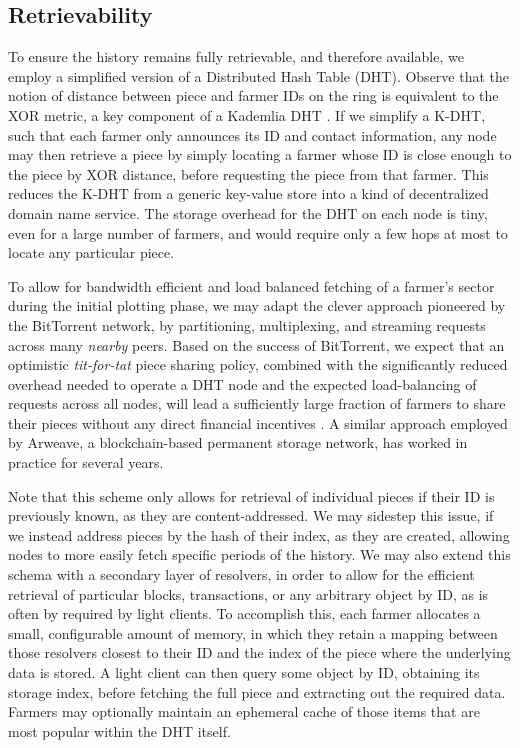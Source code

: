 \documentclass[conference]{IEEEtran}
\begin{document}
\subsection{Retrievability}

To ensure the history remains fully retrievable, and therefore available, we employ a simplified version of a Distributed Hash Table (DHT). Observe that the notion of distance between piece and farmer IDs on the ring is equivalent to the XOR metric, a key component of a Kademlia DHT \cite{maymounkov2002kademlia}. If we simplify a K-DHT, such that each farmer only announces its ID and contact information, any node may then retrieve a piece by simply locating a farmer whose ID is close enough to the piece by XOR distance, before requesting the piece from that farmer. This reduces the K-DHT from a generic key-value store into a kind of decentralized domain name service. The storage overhead for the DHT on each node is tiny, even for a large number of farmers, and would require only a few hops at most to locate any particular piece. 

To allow for bandwidth efficient and load balanced fetching of a farmer's sector during the initial plotting phase, we may adapt the clever approach pioneered by the BitTorrent network, by partitioning, multiplexing, and streaming requests across many \textit{nearby} peers. Based on the success of BitTorrent, we expect that an optimistic \textit{tit-for-tat} piece sharing policy, combined with the significantly reduced overhead needed to operate a DHT node and the expected load-balancing of requests across all nodes, will lead a sufficiently large fraction of farmers to share their pieces without any direct financial incentives \cite{cohen2003incentives}. A similar approach employed by Arweave, a blockchain-based permanent storage network, has worked in practice for several years\cite{williams2019arweave}.

Note that this scheme only allows for retrieval of individual pieces if their ID is previously known, as they are content-addressed. We may sidestep this issue, if we instead address pieces by the hash of their index, as they are created, allowing nodes to more easily fetch specific periods of the history. We may also extend this schema with a secondary layer of resolvers, in order to allow for the efficient retrieval of particular blocks, transactions, or any arbitrary object by ID, as is often by required by light clients. To accomplish this, each farmer allocates a small, configurable amount of memory, in which they retain a mapping between those resolvers closest to their ID and the index of the piece where the underlying data is stored. A light client can then query some object by ID, obtaining its storage index, before fetching the full piece and extracting out the required data. Farmers may optionally maintain an ephemeral cache of those items that are most popular within the DHT itself.  
\end{document}

